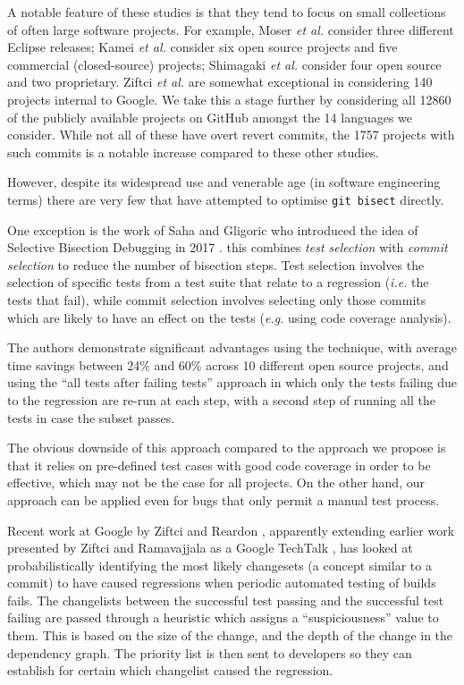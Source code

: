\documentclass[pdflatex, sn-mathphys, referee]{sn-jnl}%
\theoremstyle{thmstyleone}%
\theoremstyle{thmstyletwo}%
\theoremstyle{thmstylethree}%
\def\etal{{\it et al.}}
\def\eg{{\it e.g.}}
\def\ie{{\it i.e.}}
\def\code{\tt}
\theoremstyle{thmstyleone}
\begin{document}
A notable feature of these studies is that they tend to focus on small collections of often large software projects. For example, Moser \etal \cite{moser2008} consider three different Eclipse releases; Kamei \etal \cite{kamei2013} consider six open source projects and five commercial (closed-source) projects; Shimagaki \etal \cite{shimagaki2016} consider four open source and two proprietary. Ziftci \etal \cite{ziftci2013, ziftci2017} are somewhat exceptional in considering 140 projects internal to Google. We take this a stage further by considering all 12860 of the publicly available projects on GitHub amongst the 14 languages we consider. While not all of these have overt revert commits, the 1757 projects with such commits is a notable increase compared to these other studies.

However, despite its widespread use and venerable age (in software engineering terms) there are very few that have attempted to optimise {\code git bisect} directly.

One exception is the work of Saha and Gligoric who introduced the idea of Selective Bisection Debugging in 2017 \cite{saha2017}. this combines {\it test selection\/} with {\it commit selection\/} to reduce the number of bisection steps. Test selection involves the selection of specific tests from a test suite that relate to a regression (\ie\/ the tests that fail), while commit selection involves selecting only those commits which are likely to have an effect on the tests (\eg\/ using code coverage analysis).

The authors demonstrate significant advantages using the technique, with average time savings between 24\% and 60\% across 10 different open source projects, and using the ``all tests after failing tests'' approach in which only the tests failing due to the regression are re-run at each step, with a second step of running all the tests in case the subset passes.

The obvious downside of this approach compared to the approach we propose is that it relies on pre-defined test cases with good code coverage in order to be effective, which may not be the case for all projects. On the other hand, our approach can be applied even for bugs that only permit a manual test process.

Recent work at Google by Ziftci and Reardon \cite{ziftci2017}, apparently extending earlier work presented by Ziftci and Ramavajjala as a Google TechTalk \cite{ziftci2013}, has looked at probabilistically identifying the most likely changesets (a concept similar to a commit) to have caused regressions when periodic automated testing of builds fails. The changelists between the successful test passing and the successful test failing are passed through a heuristic which assigns a ``suspiciousness'' value to them. This is based on the size of the change, and the depth of the change in the dependency graph. The priority list is then sent to developers so they can establish for certain which changelist caused the regression. 
\end{document}
